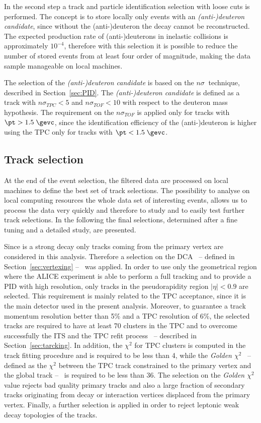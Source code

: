 In the second step a track and particle identification selection with loose cuts is performed.
The concept is to store locally only events with an \textit{(anti-)deuteron candidate}, since without
the (anti-)deuteron the \dst decay cannot be reconstructed.
The expected production rate of (anti-)deuterons in \pPb inelastic collisions is approximately $10^{-4}$,
therefore with this selection it is possible to reduce the number of stored events from at least four
order of magnitude, making the data sample manageable on local machines.

The selection of the \textit{(anti-)deuteron candidate} is based on the $n\sigma\ $ technique, described
in Section~\ref{sec:PID}.
The \textit{(anti-)deuteron candidate} is defined as a track with $n\sigma_{TPC} < 5$ and 
$n\sigma_{TOF} < 10$ with respect to the deuteron mass hypothesis. The requirement on the $n\sigma_{TOF}$
is applied only for tracks with $\pt > 1.5\; \gevc$, since the identification efficiency of the
(anti-)deuteron is higher using the TPC only for tracks with $\pt < 1.5\; \gevc$.

%
\subsection{Track selection} \label{sec:track_sel_crit}

At the end of the event selection, the filtered data are processed on local machines to
define the best set of track selections.
The possibility to analyse on local computing resources the whole data set of interesting events, allows us
to process the data very 
quickly and therefore to study and to easily test further track selections.
In the following the final selections, determined after a fine tuning and a detailed study, are presented.

Since \dstdecay is a strong decay only tracks coming from the primary vertex are 
considered in this analysis. Therefore a selection on the DCA \ -- defined in 
Section~\ref{sec:vertexing} -- \ was applied. 
In order to use only the geometrical region where the ALICE experiment is able to perform a full
tracking and to provide a PID with high resolution, only tracks in the pseudorapidity 
region $|\eta| < 0.9 $ are selected. This requirement is mainly related to the TPC acceptance,
since it is the main detector used in the present analysis. 
Moreover, to guarantee a track momentum resolution better than 5\% and a TPC \dedx resolution of
6\%, the selected tracks are required to have at least 70 clusters in the TPC and to overcome successfully the ITS and the TPC refit process
\ -- described in Section~\ref{sec:tarcking}.
In addition, the $\chi^{2}$ for TPC clusters is computed in the track fitting procedure and is
required to be less than 4, while the \textit{Golden $\chi^{2}$} \ -- defined as the $\chi^{2}$
between the TPC track constrained to the primary vertex and the global track -- 
\ is required to be less than 36. The selection on the \textit{Golden $\chi^{2}$} value
rejects bad quality primary tracks and also a large fraction of secondary tracks originating from
decay or interaction vertices displaced from the primary vertex.
Finally, a further selection is applied in order to reject leptonic weak decay topologies of the tracks. %

